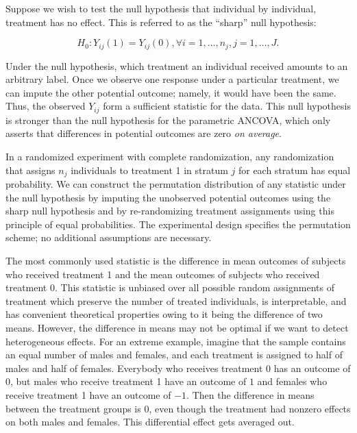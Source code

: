 \documentclass[12pt]{article}
\newcommand{\todo}[1]{{\color{red}{TO DO: \sc #1}}}
\begin{document}
Suppose we wish to test the null hypothesis that individual by individual, treatment has no effect.
This is referred to as the ``sharp'' null hypothesis:

$$H_0: Y_{ij}(1) = Y_{ij}(0), \forall i = 1, \dots, n_j, j = 1,\dots, J.$$


Under the null hypothesis, which treatment an individual received amounts to an arbitrary label.
Once we observe one response under a particular treatment, we can impute the other potential outcome; namely, it would have been the same.
Thus, the observed $Y_{ij}$ form a sufficient statistic for the data. \todo{cite P\&S}
This null hypothesis is stronger than the null hypothesis for the parametric ANCOVA, which only asserts that differences in potential outcomes are zero \textit{on average}.

In a randomized experiment with complete randomization, any randomization that assigns $n_j$ individuals to treatment 1 in stratum $j$ for each stratum has equal probability.
We can construct the permutation distribution of any statistic under the null hypothesis by imputing the unobserved potential outcomes using the sharp null hypothesis and by re-randomizing treatment assignments using this principle of equal probabilities.
The experimental design specifies the permutation scheme; no additional assumptions are necessary.

The most commonly used statistic is the difference in mean outcomes of subjects who received treatment 1 and the mean outcomes of subjects who received treatment 0.  
This statistic is unbiased over all possible random assignments of treatment which preserve the number of treated individuals,
is interpretable, 
and has convenient theoretical properties owing to it being the difference of two means.
However, the difference in means may not be optimal if we want to detect heterogeneous effects.  
For an extreme example, imagine that the sample contains an equal number of males and females, and each treatment is assigned to half of males and half of females.  
Everybody who receives treatment 0 has an outcome of 0, but males who receive treatment 1 have an outcome of $1$ and females who receive treatment 1 have an outcome of $-1$.  
Then the difference in means between the treatment groups is $0$, even though the treatment had nonzero effects on both males and females.  
This differential effect gets averaged out.
\end{document}
